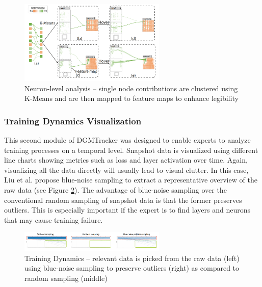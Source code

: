 \documentclass{acmsiggraph}               %
\begin{document}
\begin{figure}[!htb]
  \centering
  \includegraphics[width=2.75in]{mengchen3}
  \caption{Neuron-level analysis -- single node contributions are clustered using K-Means and are then mapped to feature maps to enhance legibility \protect\cite{Liu2018}}
  \label{fig:mengchen3}
\end{figure}

\subsubsection{Training Dynamics Visualization}
This second module of DGMTracker was designed to enable experts to analyze training processes on a temporal level.
Snapshot data is visualized using different line charts showing metrics such as loss and layer activation over time. Again, visualizing all the data directly will usually lead to visual clutter. In this case, Liu et al. propose blue-noise sampling to extract a representative overview of the raw data (see Figure \ref{fig:mengchen4}). The advantage of blue-noise sampling over the conventional random sampling of snapshot data is that the former preserves outliers. This is especially important if the expert is to find layers and neurons that may cause training failure.

\begin{figure}[!htb]
  \centering
  \includegraphics[width=2.75in]{mengchen4}
  \caption{Training Dynamics -- relevant data is picked from the raw data (left) using blue-noise sampling to preserve outliers (right) as compared to random sampling (middle) \protect\cite{Liu2018}}
  \label{fig:mengchen4}
\end{figure}
\end{document}

